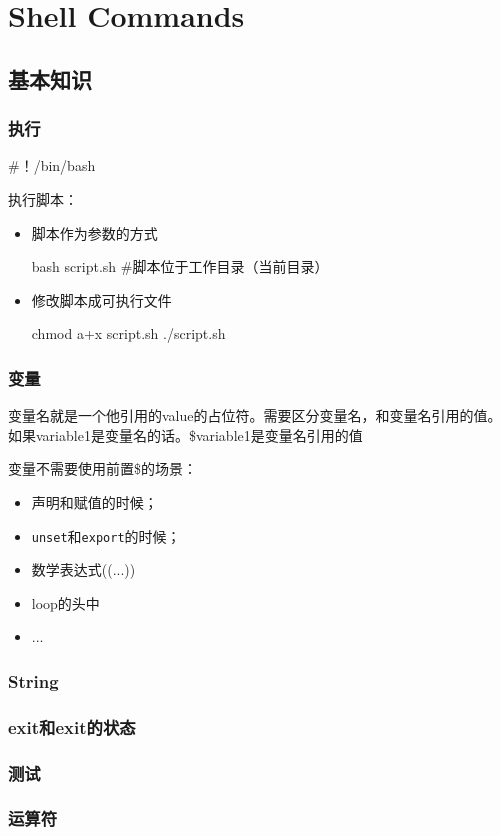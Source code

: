 \chapter{Shell Commands}

\section{基本知识}

\subsection{执行}

\begin{Bash}[开头告诉shell使用什么bash]
#！/bin/bash
\end{Bash}


执行脚本：

\begin{itemize}
\item 脚本作为参数的方式
\begin{Bash}
bash script.sh   #脚本位于工作目录（当前目录）
\end{Bash}

\item 修改脚本成可执行文件

\begin{Bash}[内核会读取首行来确定执行的bash]
chmod a+x script.sh
./script.sh
\end{Bash}

\end{itemize}

\subsection{变量}

变量名就是一个他引用的value的占位符。需要区分变量名，和变量名引用的值。如果variable1是变量名的话。\$variable1是变量名引用的值

变量不需要使用前置\$的场景：
\begin{itemize}
\item 声明和赋值的时候；
\item \lstinline$unset$和\lstinline$export$的时候；
\item 数学表达式((...))
\item loop的头中
\item ...
\end{itemize}

\subsection{String}

\subsection{exit和exit的状态}

\subsection{测试}

\subsection{运算符}


